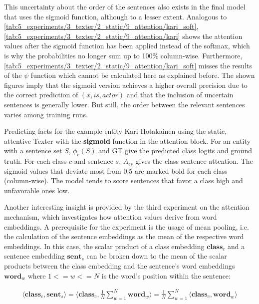 This uncertainty about the order of the sentences also exists in the final model that uses the sigmoid function, although to a lesser extent. Analogous to \autoref{tab:5_experiments/3_texter/2_static/9_attention/kari_soft},  \autoref{tab:5_experiments/3_texter/2_static/9_attention/kari} shows the attention values after the sigmoid function has been applied instead of the softmax, which is why the probabilities no longer sum up to 100\% column-wise. Furthermore, \autoref{tab:5_experiments/3_texter/2_static/9_attention/kari_soft} misses the results of the $\psi$ function which cannot be calculated here as explained before. The shown figures imply that the sigmoid version achieves a higher overall precision due to the correct prediction of $(x, is, actor)$ and that the inclusion of uncertain sentences is generally lower. But still, the order between the relevant sentences varies among training runs.

\begin{table}[t]
    \centering
    
    \caption{Predicting facts for the example entity Kari Hotakainen using the static, attentive Texter with the \textbf{sigmoid} function in the attention block. For an entity with a sentence set $S$, $\phi_c(S)$ and GT give the predicted class logits and ground truth. For each class $c$ and sentence $s$, $A_{cs}$ gives the class-sentence attention. The sigmoid values that deviate most from 0.5 are marked bold for each class (column-wise). The model tends to score sentences that favor a class high and unfavorable ones low.}
    \label{tab:5_experiments/3_texter/2_static/9_attention/kari}
\end{table}

Another interesting insight is provided by the third experiment on the attention mechanism, which investigates how attention values derive from word embeddings. A prerequisite for the experiment is the usage of mean pooling, i.e. the calculation of the sentence embeddings as the mean of the respective word embeddings. In this case, the scalar product of a class embedding $\textbf{class}_c$ and a sentence embedding $\textbf{sent}_s$ can be broken down to the mean of the scalar products between the class embedding and the sentence's word embeddings $\textbf{word}_w$ where $1 <= w <= N$ is the word's position within the sentence:

\begin{align}
    \langle \textbf{class}_c, \textbf{sent}_s \rangle
    = \langle \textbf{class}_c, \frac{1}{N} \sum_{w=1}^N \textbf{word}_w \rangle
    = \frac{1}{N} \sum_{w=1}^N \langle \textbf{class}_c, \textbf{word}_w \rangle
    \label{eq:5_experiments/3_texter/2_static/9_attention/word_embs}
\end{align}

